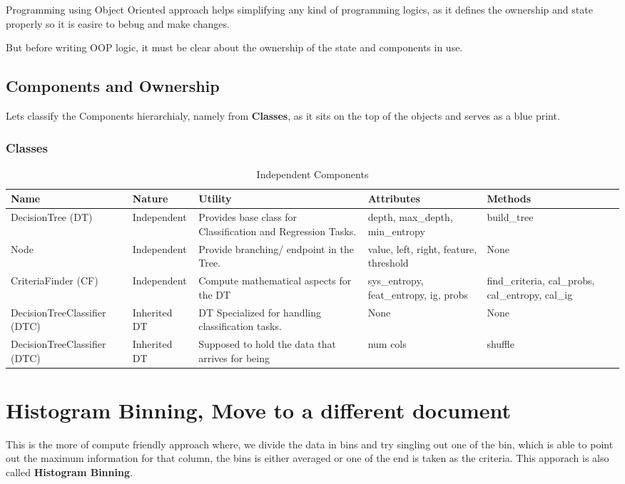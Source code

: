 \documentclass[12pt,letterpaper]{article}
\begin{document}
Programming using Object Oriented approach helps simplifying any kind of programming logics, as it defines the ownership and state properly so it is easire to bebug and make changes.

But before writing OOP logic, it must be clear about the ownership of the state and components in use.

\subsection{Components and Ownership}
Lets classify the Components hierarchialy, namely from \textbf{Classes}, as it sits on the top of the objects and serves as a blue print.
\subsubsection{Classes}
\begin{table} [H]
    \centering
    \label{Independent Components}
    \begin{tabularx}{\linewidth}{|X|X|X|X|X|}
        \hline
        Name & Nature & Utility & Attributes & Methods\\
        \hline
        DecisionTree (DT) & Independent & Provides base class for Classification and Regression Tasks.& depth, max\_depth, min\_entropy & build\_tree \\
        \hline
        Node & Independent & Provide branching/ endpoint in the Tree. & value, left, right, feature, threshold & None \\
        \hline
        CriteriaFinder (CF) & Independent & Compute mathematical aspects for the DT & sys\_entropy, feat\_entropy, ig, probs & find\_criteria, cal\_probs, cal\_entropy, cal\_ig \\
        \hline
        DecisionTreeClassifier (DTC) & Inherited DT & DT Specialized for handling classification tasks. & None & None \\
        \hline
        DecisionTreeClassifier (DTC) & Inherited DT & Supposed to hold the data that arrives for being & num cols & shuffle \\
        \hline
    \end{tabularx}
    \caption{Independent Components}
\end{table}

\section{Histogram Binning, Move to a different document}
This is the more of compute friendly approach where, we divide the data in bins and try singling out one of the bin, which is able to point out the maximum information for that column, the bins is either averaged or one of the end is taken as the criteria. This apporach is also called \textbf{Histogram Binning}.
\end{document}
